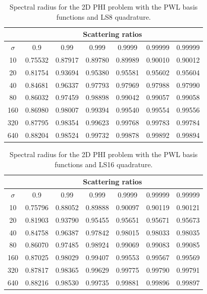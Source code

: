 \begin{table}
\caption{Spectral radius for the 2D PHI problem with the PWL basis functions and LS8 quadrature.}
\begin{center}
\def\arraystretch{1.6}
\begin{tabular}{|c|c|c|c|c|c|c|}
\hline
& \multicolumn{6}{c}{Scattering ratios}\vline\\
\hline
$\sigma$ & 0.9 & 0.99& 0.999& 0.9999& 0.99999& 0.99999 \\
\hline
10  &0.75532&0.87917&0.89780&0.89989&0.90010&0.90012\\
20  &0.81754&0.93694&0.95380&0.95581&0.95602&0.95604\\
40  &0.84681&0.96337&0.97793&0.97969&0.97988&0.97990\\
80  &0.86032&0.97459&0.98898&0.99042&0.99057&0.99058\\
160&0.86980&0.98007&0.99394&0.99540&0.99554&0.99556\\
320&0.87795&0.98354&0.99623&0.99768&0.99783&0.99784\\
640&0.88204&0.98524&0.99732&0.99878&0.99892&0.99894\\
\hline
\end{tabular}
\end{center}
\label{tab::DSA_2DPHI_LS8}
\end{table}

\begin{table}
\caption{Spectral radius for the 2D PHI problem with the PWL basis functions and LS16 quadrature.}
\begin{center}
\def\arraystretch{1.6}
\begin{tabular}{|c|c|c|c|c|c|c|}
\hline
& \multicolumn{6}{c}{Scattering ratios}\vline\\
\hline
$\sigma$ & 0.9 & 0.99& 0.999& 0.9999& 0.99999& 0.99999 \\
\hline
10  &0.75796&0.88052&0.89888&0.90097&0.90119&0.90121\\
20  &0.81903&0.93790&0.95455&0.95651&0.95671&0.95673\\
40  &0.84758&0.96387&0.97842&0.98015&0.98033&0.98035\\
80  &0.86070&0.97485&0.98924&0.99069&0.99083&0.99085\\
160&0.87025&0.98029&0.99407&0.99553&0.99567&0.99569\\
320&0.87817&0.98365&0.99629&0.99775&0.99790&0.99791\\
640&0.88216&0.98530&0.99735&0.99881&0.99896&0.99897\\
\hline
\end{tabular}
\end{center}
\label{tab::DSA_2DPHI_LS16}
\end{table}


